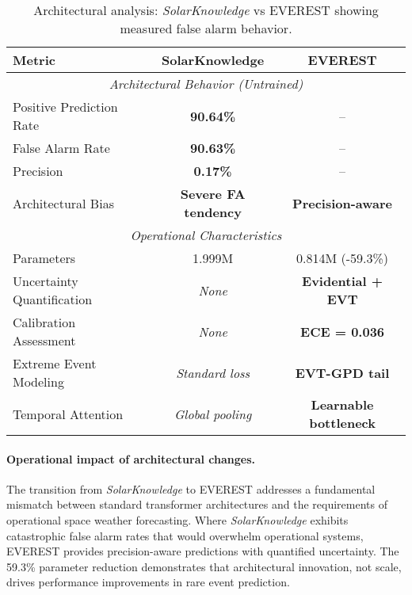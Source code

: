 \begin{table}[htbp]
  \centering
  \caption{Architectural analysis: \textit{SolarKnowledge} vs \textsc{EVEREST} showing measured false alarm behavior.}
  \label{tab:architectural_analysis}
  \renewcommand{\arraystretch}{1.2}
  \begin{tabular}{@{}lcc@{}}
    \toprule
    \textbf{Metric} & \textbf{SolarKnowledge} & \textbf{EVEREST} \\
    \midrule
    \multicolumn{3}{c}{\textit{Architectural Behavior (Untrained)}} \\
    \midrule
    Positive Prediction Rate & \textbf{90.64\%} & -- \\
    False Alarm Rate & \textbf{90.63\%} & -- \\
    Precision & \textbf{0.17\%} & -- \\
    Architectural Bias & \textbf{Severe FA tendency} & \textbf{Precision-aware} \\
    \midrule
    \multicolumn{3}{c}{\textit{Operational Characteristics}} \\
    \midrule
    Parameters & 1.999M & 0.814M (-59.3\%) \\
    Uncertainty Quantification & \emph{None} & \textbf{Evidential + EVT} \\
    Calibration Assessment & \emph{None} & \textbf{ECE = 0.036} \\
    Extreme Event Modeling & \emph{Standard loss} & \textbf{EVT-GPD tail} \\
    Temporal Attention & \emph{Global pooling} & \textbf{Learnable bottleneck} \\
    \bottomrule
  \end{tabular}
\end{table}

\paragraph{Operational impact of architectural changes.}
The transition from \textit{SolarKnowledge} to \textsc{EVEREST} addresses a fundamental mismatch between standard transformer architectures and the requirements of operational space weather forecasting. Where \textit{SolarKnowledge} exhibits catastrophic false alarm rates that would overwhelm operational systems, \textsc{EVEREST} provides precision-aware predictions with quantified uncertainty. The 59.3\% parameter reduction demonstrates that architectural innovation, not scale, drives performance improvements in rare event prediction.

